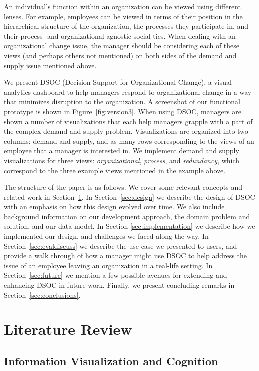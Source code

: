 \documentclass[journal]{vgtc}                %
\begin{document}
An individual's function within an organization can be viewed using different lenses. For example, employees can be viewed in terms of their position in the hierarchical structure of the organization, the processes they participate in, and their process- and organizational-agnostic social ties. When dealing with an organizational change issue, the manager should be considering each of these views (and perhaps others not mentioned) on both sides of the demand and supply issue mentioned above.

We present DSOC (Decision Support for Organizational Change), a visual analytics dashboard to help managers respond to organizational change in a way that minimizes disruption to the organization. A screenshot of our functional prototype is shown in Figure~\ref{fig:version3}. When using DSOC, managers are shown a number of visualizations that each help managers grapple with a part of the complex demand and supply problem. Visualizations are organized into two columns: demand and supply, and as many rows corresponding to the views of an employee that a manager is interested in. We implement demand and supply visualizations for three views: \emph{organizational}, \emph{process}, and \emph{redundancy}, which correspond to the three example views mentioned in the example above. 

The structure of the paper is as follows. We cover some relevant concepts and related work in Section~\ref{sec:litreview}. In Section~\ref{sec:design} we describe the design of DSOC with an emphasis on how this design evolved over time. We also include background information on our development approach, the domain problem and solution, and our data model. In Section \ref{sec:implementation} we describe how we implemented our design, and challenges we faced along the way. In Section~\ref{sec:evaldiscuss} we describe the use case we presented to users, and provide a walk through of how a manager might use DSOC to help address the issue of an employee leaving an organization in a real-life setting. In Section~\ref{sec:future} we mention a few possible avenues for extending and enhancing DSOC in future work. Finally, we present concluding remarks in Section~\ref{sec:conclusions}.

\section{Literature Review}
\label{sec:litreview}

\subsection{Information Visualization and Cognition}
\end{document}
